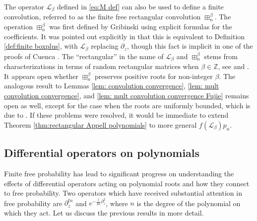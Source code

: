 \documentclass[reqno]{amsart}
\newcommand{\1}{\mathbf{1}}
\newcommand{\Z}{\mathbb{Z}}
\newcommand{\LP}{\mathcal{LP}}
\theoremstyle{plain}
\theoremstyle{definition}
\theoremstyle{remark}
\numberwithin{equation}{section}
\begin{document}
The operator $\mathscr{L}_{\beta}$ defined in \eqref{eq:M def} can also be used to define a finite convolution, referred to as the finite free rectangular convolution $\boxplus_{n}^{\beta}$. The operation $\boxplus_{n}^{\beta}$ was first defined by Gribinski \cite{Gribinski2024} using explicit formulas for the coefficients. It was pointed out explicitly in \cite{campbell2025freeinfinitedivisibilityfractional} that this is equivalent to Definition \ref{def:finite boxplus}, with $\mathscr{L}_{\beta}$ replacing $\partial_{z}$, though this fact is implicit in one of the proofs of Cuenca \cite{Cuenca24}. 
The ``rectangular'' in the name of $\mathscr{L}_{\beta}$ and $\boxplus_{n}^{\beta}$ stems from characterizations in terms of random rectangular matrices when $\beta\in\Z$, see \cite{Gribinski2024} and \cite[Lemma 1.10]{campbell2025freeinfinitedivisibilityfractional}. It appears open whether $\boxplus_{n}^{\beta}$ preserves positive roots for non-integer $\beta$. The analogous result to Lemmas \ref{lem: convolution convergence}, \ref{lem: mult convolution convergence}, and \ref{lem: mult convolution convergence Fujie} remains open as well, except for the case when the roots are uniformly bounded, which is due to \cite{Cuenca24}. If these problems were resolved, it would be immediate to extend Theorem \ref{thm:rectangular Appell polynomials} to more general $f(\mathscr{L}_{\beta})p_n$. 

\subsection{Differential operators on polynomials} Finite free probability has lead to significant progress on understanding the effects of differential operators acting on polynomial roots and how they connect to free probability. Two operators which have received substantial attention in free probability are $\partial_{z}^{tn}$ and $e^{-\frac{t}{2n} \partial_{z}^2 }$, where $n$ is the degree of the polynomial on which they act.  Let us discuss the previous results in more detail.

\end{document}
